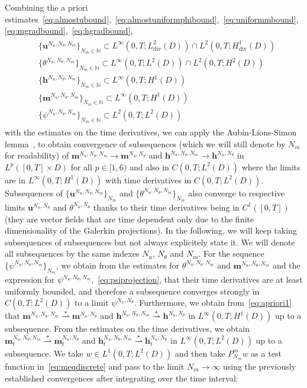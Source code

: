 \documentclass[10pt,letterpaper,twoside]{amsart}
\theoremstyle{definition}{\newtheorem{definition}[lemma]{Definition}}
\theoremstyle{note}{\newtheorem{claim}{Claim}[section]
\newtheorem*{claim*}{Claim}}
\numberwithin{equation}{section}
\newcommand{\dom}{D}
\newcommand{\weakstar}{\overset{\star}\rightharpoonup}
\newcommand{\N}{\mathbb{N}}
\newcommand{\Div}{\operatorname{div}}
\newcommand{\V}{H^1_{\Div}(\dom)}
\newcommand{\bu}{\mathbf{u}}
\newcommand{\bm}{\mathbf{m}}
\newcommand{\bma}{\mathbf{m}^{N_u,N_\theta,N_m}}
\newcommand{\tha}{\theta^{N_u,N_\theta,N_m}}
\newcommand{\bh}{\mathbf{h}}
\begin{document}
 Combining the  a priori estimates~\eqref{eq:almostubound},~\eqref{eq:almostuniformphibound},~\eqref{eq:uniformmbound},~\eqref{eq:mgradbound},~\eqref{eq:hgradbound},
\begin{align}\label{eq:apriori1}
	\begin{split}
		&\{\bu^{N_u,N_\theta,N_m}\}_{N_m\in\N} \subset L^\infty(0,T;L^2_{\text{div}}(\dom))\cap L^2(0,T;\V) \\
		&\{\theta^{N_u,N_\theta,N_m}\}_{N_m\in\N} \subset L^\infty(0,T;L^2(\dom))\cap L^2(0,T;H^2(\dom)) \\
		&\{\bh^{N_u,N_\theta,N_m}\}_{N_m\in\N} \subset L^\infty(0,T;H^1(\dom)) \\
	&\{\bm^{N_u,N_\theta,N_m} \}_{N_m\in\N} \subset  L^\infty(0,T;H^1(\dom)) \\
		&\{\psi^{N_u,N_\theta,N_m} \}_{N_m\in\N} \subset L^2(0,T;L^2(\dom))
	\end{split}
\end{align}
with the estimates on the time derivatives, we can apply the  Aubin-Lions-Simon lemma~\cite{Simon1987}, to obtain convergence of subsequences (which we will still denote by $N_m$ for readability) of $\bm^{N_u,N_\theta,N_m}\to \bm^{N_u,N_\theta}$ and $\bh^{N_u,N_\theta,N_m}\to \bh^{N_u,N_\theta}$ in $L^p([0,T]\times\dom)$ for all $p\in [1,6)$ and also in $C(0,T;L^2(\dom))$ where the limits are in $ L^\infty(0,T;H^1(\dom))$ with time derivatives in $C(0,T;L^2(\dom))$. Subsequences of $\{\bu^{N_u,N_\theta,N_m}\}_{N_m}$ and $\{\theta^{N_u,N_\theta,N_m}\}_{N_m}$ also converge to respective limits $\bu^{N_u,N_\theta}$ and $\theta^{N_u,N_\theta}$  thanks to their time derivatives being in $C^1([0,T])$ (they are vector fields that are time dependent only due to the finite dimensionality of the Galerkin projections). In the following, we will keep taking subsequences of subsequences but not always explicitely state it. We will denote all subsequences by the same indexes $N_u$, $N_\theta$ and $N_m$.
For the sequence $\{\psi^{N_u,N_\theta,N_m}\}_{N_m}$, we obtain from the estimates for $\tha$ and $\bma$ and the expression for $\psi^{N_u,N_\theta,N_m}$,~\eqref{eq:psiprojection}, that their time derivatives are at least uniformly bounded, and therefore a subsequence converges strongly in $C(0,T;L^2(\dom))$ to a limit $\psi^{N_u,N_\theta}$.
 Furthermore, we obtain from~\eqref{eq:apriori1} that $\bm^{N_u,N_\theta,N_m}\weakstar \bm^{N_u,N_\theta}$ and $\bh^{N_u,N_\theta,N_m}\weakstar \bh^{N_u,N_\theta}$ in $L^\infty(0,T;H^1(\dom))$ up to a subsequence. From the estimates on the time derivatives, we obtain $\bm_t^{N_u,N_\theta,N_m}\weakstar \bm_t^{N_u,N_\theta}$ and $\bh_t^{N_u,N_\theta,N_m}\weakstar \bh_t^{N_u,N_\theta}$ in $L^\infty(0,T;L^2(\dom))$ up to a subsequence. We take $w\in L^1(0,T;L^2(\dom))$ and then take $P_{N_m}^m w$ as a test function in~\eqref{eq:meqdiscrete} and pass to the limit $N_m\to\infty$ using the previously established convergences after integrating over the time interval:
\end{document}
